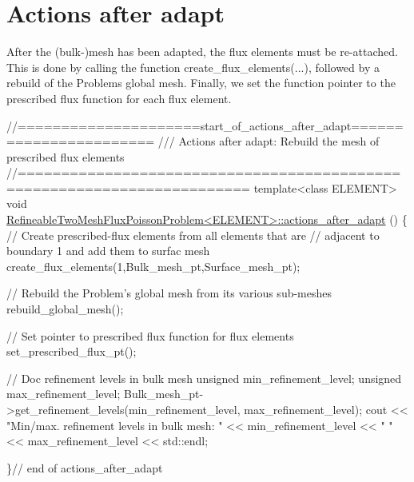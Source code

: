  

\hypertarget{index_after_adapt}{}\section{Actions after adapt}\label{index_after_adapt}
After the (bulk-\/)mesh has been adapted, the flux elements must be re-\/attached. This is done by calling the function {\ttfamily create\+\_\+flux\+\_\+elements}(...), followed by a rebuild of the {\ttfamily Problem\textquotesingle{}s} global mesh. Finally, we set the function pointer to the prescribed flux function for each flux element.


\begin{DoxyCodeInclude}
\textcolor{comment}{//=====================start\_of\_actions\_after\_adapt=======================}
\textcolor{comment}{///  Actions after adapt: Rebuild the mesh of prescribed flux elements}
\textcolor{comment}{}\textcolor{comment}{//========================================================================}
\textcolor{keyword}{template}<\textcolor{keyword}{class} ELEMENT>
\textcolor{keywordtype}{void} \hyperlink{classRefineableTwoMeshFluxPoissonProblem_a0140155529861f5e63ab32feece3c9b6}{RefineableTwoMeshFluxPoissonProblem<ELEMENT>::actions\_after\_adapt}
      ()
\{
 \textcolor{comment}{// Create prescribed-flux elements from all elements that are }
 \textcolor{comment}{// adjacent to boundary 1 and add them to surfac mesh}
 create\_flux\_elements(1,Bulk\_mesh\_pt,Surface\_mesh\_pt);
 
 \textcolor{comment}{// Rebuild the Problem's global mesh from its various sub-meshes}
 rebuild\_global\_mesh();
 
 \textcolor{comment}{// Set pointer to prescribed flux function for flux elements}
 set\_prescribed\_flux\_pt();
 
 \textcolor{comment}{// Doc refinement levels in bulk mesh}
 \textcolor{keywordtype}{unsigned} min\_refinement\_level;
 \textcolor{keywordtype}{unsigned} max\_refinement\_level;
 Bulk\_mesh\_pt->get\_refinement\_levels(min\_refinement\_level,
                                     max\_refinement\_level); 
 cout << \textcolor{stringliteral}{"Min/max. refinement levels in bulk mesh: "} 
      << min\_refinement\_level << \textcolor{stringliteral}{" "} 
      << max\_refinement\_level << std::endl;
 
\}\textcolor{comment}{// end of actions\_after\_adapt}

\end{DoxyCodeInclude}




